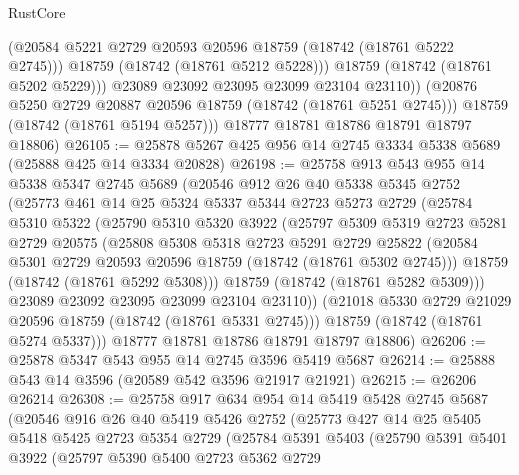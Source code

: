 \begin{lexlean}{RustCore}
\begin{coremodule}
                (@20584 @5221 @2729 @20593 @20596 @18759 (@18742 (@18761 @5222 @2745)))
                @18759
                (@18742 (@18761 @5212 @5228)))
              @18759
              (@18742 (@18761 @5202 @5229)))
            @23089
            @23092
            @23095
            @23099
            @23104
            @23110))
        (@20876 @5250 @2729 @20887 @20596 @18759 (@18742 (@18761 @5251 @2745)))
        @18759
        (@18742 (@18761 @5194 @5257)))
      @18777
      @18781
      @18786
      @18791
      @18797
      @18806)
@26105 := @25878 @5267 @425 @956 @14 @2745 @3334 @5338 @5689 (@25888 @425 @14 @3334 @20828)
@26198 := @25758
    @913
    @543
    @955
    @14
    @5338
    @5347
    @2745
    @5689
    (@20546
      @912
      @26
      @40
      @5338
      @5345
      @2752
      (@25773
        @461
        @14
        @25
        @5324
        @5337
        @5344
        @2723
        @5273
        @2729
        (@25784
          @5310
          @5322
          (@25790
            @5310
            @5320
            @3922
            (@25797
              @5309
              @5319
              @2723
              @5281
              @2729
              @20575
              (@25808
                @5308
                @5318
                @2723
                @5291
                @2729
                @25822
                (@20584 @5301 @2729 @20593 @20596 @18759 (@18742 (@18761 @5302 @2745)))
                @18759
                (@18742 (@18761 @5292 @5308)))
              @18759
              (@18742 (@18761 @5282 @5309)))
            @23089
            @23092
            @23095
            @23099
            @23104
            @23110))
        (@21018 @5330 @2729 @21029 @20596 @18759 (@18742 (@18761 @5331 @2745)))
        @18759
        (@18742 (@18761 @5274 @5337)))
      @18777
      @18781
      @18786
      @18791
      @18797
      @18806)
@26206 := @25878 @5347 @543 @955 @14 @2745 @3596 @5419 @5687
@26214 := @25888 @543 @14 @3596 (@20589 @542 @3596 @21917 @21921)
@26215 := @26206 @26214
@26308 := @25758
    @917
    @634
    @954
    @14
    @5419
    @5428
    @2745
    @5687
    (@20546
      @916
      @26
      @40
      @5419
      @5426
      @2752
      (@25773
        @427
        @14
        @25
        @5405
        @5418
        @5425
        @2723
        @5354
        @2729
        (@25784
          @5391
          @5403
          (@25790
            @5391
            @5401
            @3922
            (@25797
              @5390
              @5400
              @2723
              @5362
              @2729

\end{coremodule}
\end{lexlean}
